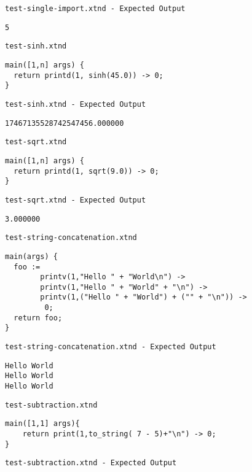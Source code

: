 \medskip \noindent \texttt{test-single-import.xtnd - Expected Output}


\begin{lstlisting}
5
\end{lstlisting}


\medskip \noindent \texttt{test-sinh.xtnd}


\begin{lstlisting}
main([1,n] args) {
  return printd(1, sinh(45.0)) -> 0;
}
\end{lstlisting}


\medskip \noindent \texttt{test-sinh.xtnd - Expected Output}


\begin{lstlisting}
17467135528742547456.000000
\end{lstlisting}


\medskip \noindent \texttt{test-sqrt.xtnd}


\begin{lstlisting}
main([1,n] args) {
  return printd(1, sqrt(9.0)) -> 0;
}
\end{lstlisting}


\medskip \noindent \texttt{test-sqrt.xtnd - Expected Output}


\begin{lstlisting}
3.000000
\end{lstlisting}


\medskip \noindent \texttt{test-string-concatenation.xtnd}


\begin{lstlisting}
main(args) {
  foo :=
		printv(1,"Hello " + "World\n") ->
		printv(1,"Hello " + "World" + "\n") ->
		printv(1,("Hello " + "World") + ("" + "\n")) ->
		 0;
  return foo;
}
\end{lstlisting}


\medskip \noindent \texttt{test-string-concatenation.xtnd - Expected Output}


\begin{lstlisting}
Hello World
Hello World
Hello World
\end{lstlisting}


\medskip \noindent \texttt{test-subtraction.xtnd}


\begin{lstlisting}
main([1,1] args){
	return print(1,to_string( 7 - 5)+"\n") -> 0;
}
\end{lstlisting}


\medskip \noindent \texttt{test-subtraction.xtnd - Expected Output}


